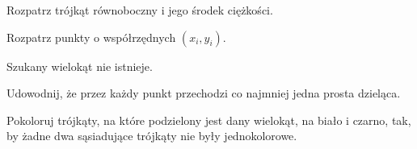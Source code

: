 
\begin{hints_list}
	\item Rozpatrz trójkąt równoboczny i jego środek ciężkości.
	\item Rozpatrz punkty o współrzędnych $(x_i, y_i)$.
	\item Szukany wielokąt nie istnieje.
	\item Udowodnij, że przez każdy punkt przechodzi co najmniej jedna prosta dzieląca.
	\item Pokoloruj trójkąty, na które podzielony jest dany wielokąt, na biało i czarno, tak, by żadne dwa sąsiadujące trójkąty nie były jednokolorowe.
	\item 
\end{hints_list}